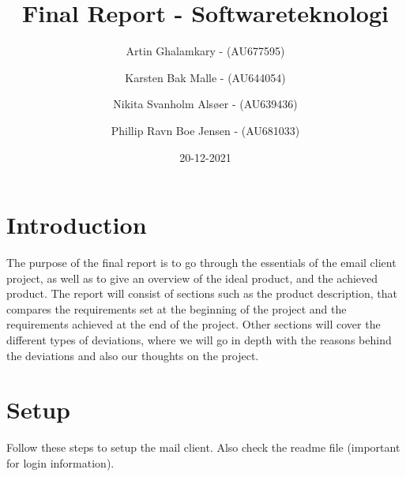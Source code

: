 \documentclass{article}
\title{Final Report - Softwareteknologi} %
\author{Artin Ghalamkary - (AU677595) \and Karsten Bak Malle - (AU644054) \and Nikita Svanholm Alsøer - (AU639436) \and Phillip Ravn Boe Jensen - (AU681033)}%
\date{20-12-2021}
\begin{document}
\maketitle

\section*{Introduction} 
The purpose of the final report is to go through the essentials of the email client project, as well as to give an overview of the ideal product, and the achieved product. The report will consist of sections such as the product description, that compares the requirements set at the beginning of the project and the requirements achieved at the end of the project. Other sections will cover the different types of deviations, where we will go in depth with the reasons behind the deviations and also our thoughts on the project. 
\newpage
\section*{Setup}
Follow these steps to setup the mail client. Also check the readme file (important for login information).
\newline
\end{document}
